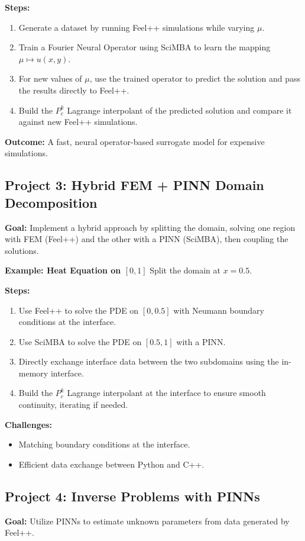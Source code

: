 \documentclass[11pt]{article}
\begin{document}
\textbf{Steps:}
\begin{enumerate}[label=\arabic*.]
    \item Generate a dataset by running Feel++ simulations while varying \(\mu\).
    \item Train a Fourier Neural Operator using SciMBA to learn the mapping \(\mu \mapsto u(x,y)\).
    \item For new values of \(\mu\), use the trained operator to predict the solution and pass the results directly to Feel++.
    \item Build the \( P_c^k \) Lagrange interpolant of the predicted solution and compare it against new Feel++ simulations.
\end{enumerate}

\textbf{Outcome:}  
A fast, neural operator-based surrogate model for expensive simulations.

\subsection{Project 3: Hybrid FEM + PINN Domain Decomposition}
\textbf{Goal:}  
Implement a hybrid approach by splitting the domain, solving one region with FEM (Feel++) and the other with a PINN (SciMBA), then coupling the solutions.

\textbf{Example: Heat Equation on \([0,1]\)}
Split the domain at \( x = 0.5 \).

\textbf{Steps:}
\begin{enumerate}[label=\arabic*.]
    \item Use Feel++ to solve the PDE on \([0, 0.5]\) with Neumann boundary conditions at the interface.
    \item Use SciMBA to solve the PDE on \([0.5,1]\) with a PINN.
    \item Directly exchange interface data between the two subdomains using the in-memory interface.
    \item Build the \( P_c^k \) Lagrange interpolant at the interface to ensure smooth continuity, iterating if needed.
\end{enumerate}

\textbf{Challenges:}
\begin{itemize}
    \item Matching boundary conditions at the interface.
    \item Efficient data exchange between Python and C++.
\end{itemize}

\subsection{Project 4: Inverse Problems with PINNs}
\textbf{Goal:}  
Utilize PINNs to estimate unknown parameters from data generated by Feel++.
\end{document}
